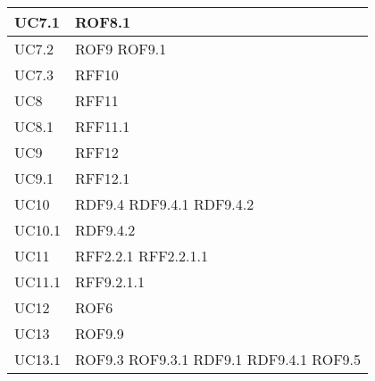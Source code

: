 \documentclass[../AnalisideiRequisiti.tex]{subfiles}
\begin{document}
\begin{longtable}{| p{4cm} | p{4cm} |}
		\hline
		\newline UC7.1 &  \newline ROF8.1 \\[1em]
		\hline
		\newline UC7.2 &  \newline ROF9 \newline ROF9.1 \\[1em]
		\hline
		\newline UC7.3 &  \newline RFF10 \\[1em]
		\hline
		\newline UC8 &  \newline RFF11 \\[1em]
		\hline
		\newline UC8.1 &  \newline RFF11.1 \\[1em]
		\hline
		\newline UC9 &  \newline RFF12 \\[1em]
		\hline
		\newline UC9.1 &  \newline RFF12.1 \\[1em]
		\hline
		\newline UC10 &  \newline RDF9.4 \newline RDF9.4.1 \newline RDF9.4.2 \\[1em]
		\hline
		\newline UC10.1 &  \newline RDF9.4.2 \\[1em]
		\hline
		\newline UC11 &  \newline RFF2.2.1 \newline RFF2.2.1.1\\[1em]
		\hline
		\newline UC11.1 &  \newline RFF9.2.1.1 \\[1em]
		\hline
		\newline UC12 &  \newline ROF6 \\[1em]
		\hline			
		\newline UC13 &  \newline ROF9.9 \\[1em]
		\hline			
		\newline UC13.1 &  \newline ROF9.3 \newline ROF9.3.1 \newline RDF9.1 \newline RDF9.4.1 \newline ROF9.5 \\[1em]

\end{longtable}
\end{document}
